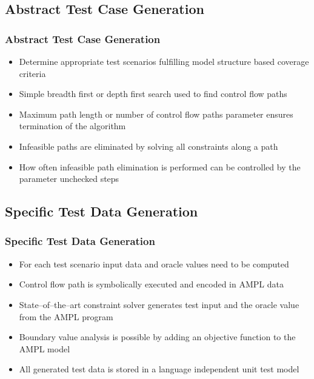 \documentclass{beamer}
\begin{document}
\subsection{Abstract Test Case Generation}
\begin{frame}
\frametitle{Abstract Test Case Generation}
\begin{itemize} 
\item Determine appropriate test scenarios fulfilling model structure based coverage criteria
\item Simple breadth first or depth first search used to find control flow paths
\item Maximum path length or number of control flow paths parameter ensures termination of the algorithm
\item Infeasible paths are eliminated by solving all constraints along a path
\item How often infeasible path elimination is performed can be controlled by the parameter unchecked steps
\end{itemize}
\end{frame} 


\subsection{Specific Test Data Generation}

\begin{frame}
\frametitle{Specific Test Data Generation}
\begin{itemize} 
\item For each test scenario input data and oracle values need to be computed
\item Control flow path is symbolically executed and encoded in AMPL data
\item State--of--the--art constraint solver generates test input and the oracle value from the AMPL program
\item Boundary value analysis is possible by adding an objective function to the AMPL model
\item All generated test data is stored in a language independent unit test model
\end{itemize}
\end{frame}
\end{document}
